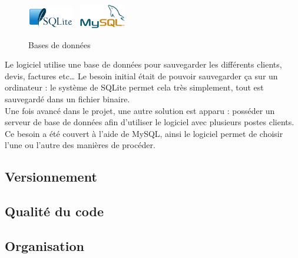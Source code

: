\begin{figure}
\begin{center}
\includegraphics[width=0.18\textwidth]{../beamer/logos/sqlite.png}~
\includegraphics[width=0.18\textwidth]{../beamer/logos/mysql.png}
\end{center}
\caption{Bases de données}
\end{figure}
Le logiciel utilise une base de données pour sauvegarder les différents clients, devis, factures etc… Le besoin initial était de pouvoir
sauvegarder ça sur un ordinateur : le système de SQLite permet cela très simplement, tout est sauvegardé dans un fichier binaire.\\ Une fois
avancé dans le projet, une autre solution est apparu : posséder un serveur de base de données afin d'utiliser le logiciel avec plusieurs
postes clients. Ce besoin a été couvert à l'aide de MySQL, ainsi le logiciel permet de choisir l'une ou l'autre des manières de procéder.


\subsection{Versionnement}


\subsection{Qualité du code}


\subsection{Organisation}

